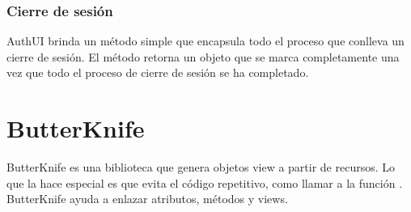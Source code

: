 \subsubsection{Cierre de sesión}
\label{\detokenize{dev_docs:cierre-de-sesion}}
AuthUI brinda un método  simple que encapsula todo el proceso
que conlleva un cierre de sesión. El método retorna un objeto 
que se marca completamente una vez que todo el proceso de cierre de sesión
se ha completado.

%
\begin{sphinxVerbatim}[commandchars=\\\{\}]
  
              
                     
                      
                      
\end{sphinxVerbatim}


\section*{ ButterKnife}
\label{\detokenize{dev_docs:butterknife}}
ButterKnife es una biblioteca que genera
objetos view a partir de recursos. Lo que la hace especial es que evita
el código repetitivo, como llamar a la función . ButterKnife
ayuda a enlazar atributos, métodos y views.


